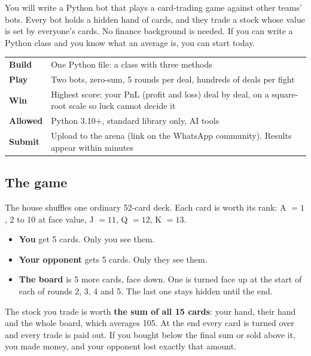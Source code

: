 You will write a Python bot that plays a card-trading game against other teams' bots. Every
bot holds a hidden hand of cards, and they trade a stock whose value is set by everyone's
cards. No finance background is needed. If you can write a Python class and you know what an
average is, you can start today.

\begin{center}
\begin{tabularx}{\linewidth}{@{}lL@{}}
\toprule
\textbf{Build}   & One Python file: a  class with three methods \\
\textbf{Play}    & Two bots, zero-sum, 5 rounds per deal, hundreds of deals per fight \\
\textbf{Win}     & Highest score: your PnL (profit and loss) deal by deal, on a square-root scale so luck cannot decide it \\
\textbf{Allowed} & Python 3.10+, standard library only, AI tools \\
\textbf{Submit}  & Upload to the arena (link on the WhatsApp community). Results appear within minutes \\
\bottomrule
\end{tabularx}
\end{center}

\subsection{The game}

The house shuffles one ordinary 52-card deck. Each card is worth its rank: A $=1$, 2 to 10 at
face value, J $=11$, Q $=12$, K $=13$.

\begin{itemize}
  \item \textbf{You} get 5 cards. Only you see them.
  \item \textbf{Your opponent} gets 5 cards. Only they see them.
  \item \textbf{The board} is 5 more cards, face down. One is turned face up at the start of
        each of rounds 2, 3, 4 and 5. The last one stays hidden until the end.
\end{itemize}

The stock you trade is worth \textbf{the sum of all 15 cards}: your hand, their hand and the
whole board, which averages 105. At the end every card is turned over and every trade is paid
out. If you bought below the final sum or sold above it, you made money, and your opponent lost
exactly that amount.

